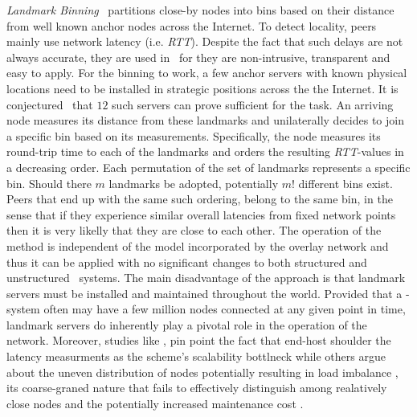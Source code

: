 
\emph{Landmark Binning}~\cite{RHKS2002} partitions close-by nodes
into bins based on their distance from well known anchor nodes across the
Internet.%
To detect locality, peers mainly use network latency (i.e. \emph{RTT}).
Despite the fact that such delays are not always accurate,
they are used in~\cite{RHKS2002} for they are
non-intrusive, transparent and easy to apply.
For the binning to work, a few anchor servers with known
physical locations need to be installed in strategic positions 
across the the Internet. 
It is conjectured~\cite{RHKS2002} that $12$ such servers can prove
sufficient for the task.
An arriving node measures its distance from these landmarks
and unilaterally decides to join a specific bin based on its measurements.
Specifically, the node measures its round-trip time to each of the landmarks and
orders the resulting \emph{RTT}-values in a decreasing order. 
%
%
Each permutation of the set of landmarks represents a specific bin. Should there
$m$ landmarks be adopted, potentially $m!$  different bins exist. Peers that
end up with the same such ordering, belong to the same bin, in the sense that
if they experience similar overall latencies from fixed network points then it
is very likelly that they are close to each other.
The operation of the method is independent of the model 
incorporated by the overlay network and thus it can be
applied with no significant changes to 
both structured and unstructured \p\ systems.
The main disadvantage of the approach is that 
landmark servers must be installed and maintained throughout the world.
Provided that a \p-system often may have a few million nodes 
connected at any given point in time, landmark servers do 
inherently play a pivotal role in the operation of the network. Moreover,
studies like \cite{GSG2002}, pin point the fact that end-host shoulder the
latency measurments as the scheme's scalability bottlneck while others argue
about the uneven distribution of nodes potentially resulting in load imbalance
\cite{CDCR2002,M2003,ZZZSZ2004}, its coarse-graned nature that fails to
effectively distinguish among realatively close nodes \cite{RGJZ2004} and the
potentially increased maintenance cost \cite{XTZ2003}.



